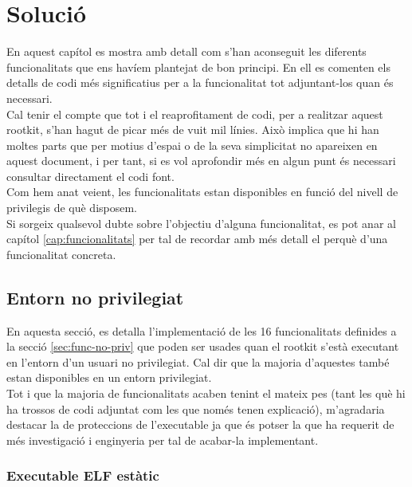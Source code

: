 \chapter{Solució}

En aquest capítol es mostra amb detall com s'han aconseguit les diferents funcionalitats que ens havíem 
plantejat de bon principi. En ell es comenten els detalls de codi més significatius per a la funcionalitat
tot adjuntant-los quan és necessari. \\

Cal tenir el compte que tot i el reaprofitament de codi, per a realitzar aquest rootkit, s'han hagut de 
picar més de vuit mil línies. Això implica que hi han moltes parts que per motius d'espai o de la seva
simplicitat no apareixen en aquest document, i
per tant, si es vol aprofondir més en algun punt és necessari consultar directament el codi 
font. \\

Com hem anat veient, les funcionalitats estan disponibles en funció del nivell de privilegis de què disposem. \\

Si sorgeix qualsevol dubte sobre l'objectiu d'alguna funcionalitat, es pot anar al capítol \ref{cap:funcionalitats} per tal de recordar amb més 
detall el perquè d'una funcionalitat concreta. \\

\section{Entorn no privilegiat}

En aquesta secció, es detalla l'implementació de les 16 funcionalitats definides a la secció 
\ref{sec:func-no-priv} que poden ser usades 
quan el rootkit s'està executant en l'entorn d'un usuari no privilegiat. Cal dir que la majoria d'aquestes
també estan disponibles en un entorn privilegiat. \\

Tot i que la majoria de funcionalitats acaben tenint el mateix pes (tant les què hi ha trossos de codi 
adjuntat com les que només tenen explicació), m'agradaria destacar la de proteccions de l'executable ja que 
és potser la que ha requerit de més investigació i enginyeria per tal de acabar-la implementant. \\

\subsection{Executable ELF estàtic}

